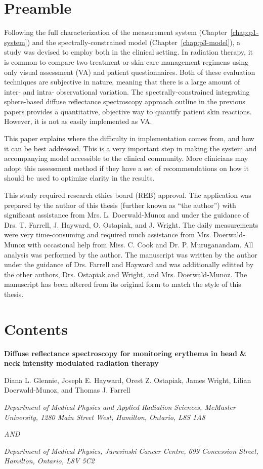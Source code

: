 \label{chap:p4-imrt_study}
\section*{Preamble}
Following the full characterization of the measurement system (Chapter~\ref{chap:p1-system}) and the spectrally-constrained model (Chapter~\ref{chap:p3-model}), a study was devised to employ both in the clinical setting. In radiation therapy, it is common to compare two treatment or skin care management regimens using only visual assessment (VA) and patient questionnaires. Both of these evaluation techniques are subjective in nature, meaning that there is a large amount of inter- and intra- observational variation. The spectrally-constrained integrating sphere-based diffuse reflectance spectroscopy approach outline in the previous papers provides a quantitative, objective way to quantify patient skin reactions. However, it is not as easily implemented as VA.

This paper explains where the difficulty in implementation comes from, and how it can be best addressed. This is a very important step in making the system and accompanying model accessible to the clinical community. More clinicians may adopt this assessment method if they have a set of recommendations on how it should be used to optimize clarity in the results.

This study required research ethics board (REB) approval. The application was prepared by the author of this thesis (further known as ``the author'') with significant assistance from Mrs. L. Doerwald-Munoz and under the guidance of Drs. T. Farrell, J. Hayward, O. Ostapiak, and J. Wright. The daily measurements were very time-consuming and required much assistance from Mrs. Doerwald-Munoz with occasional help from Miss. C. Cook and Dr. P. Muruganandam. All analysis was performed by the author. The manuscript was written by the author under the guidance of Drs. Farrell and Hayward and was additionally editted by the other authors, Drs. Ostapiak and Wright, and Mrs. Doerwald-Munoz. The manuscript has been altered from its original form to match the style of this thesis.

\section*{Contents}

\begin{center}
	
	\textbf{Diffuse reflectance spectroscopy for monitoring erythema in head \& neck intensity modulated radiation therapy}
	
	Diana L. Glennie, Joseph E. Hayward, Orest Z. Ostapiak, James Wright, Lilian Doerwald-Munoz, and Thomas J. Farrell
	
	\textit{Department of Medical Physics and Applied Radiation Sciences, McMaster University, 1280 Main Street West, Hamilton, Ontario, L8S 1A8}
	
	\textit{AND}
	
	\textit{Department of Medical Physics, Juravinski Cancer Centre, 699 Concession Street, Hamilton, Ontario, L8V 5C2}
	
\end{center}

